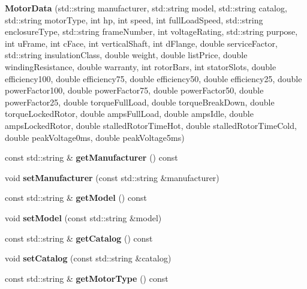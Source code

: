 \begin{DoxyCompactItemize}
{\bfseries Motor\+Data} (std\+::string manufacturer, std\+::string model, std\+::string catalog, std\+::string motor\+Type, int hp, int speed, int full\+Load\+Speed, std\+::string enclosure\+Type, std\+::string frame\+Number, int voltage\+Rating, std\+::string purpose, int u\+Frame, int c\+Face, int vertical\+Shaft, int d\+Flange, double service\+Factor, std\+::string insulation\+Class, double weight, double list\+Price, double winding\+Resistance, double warranty, int rotor\+Bars, int stator\+Slots, double efficiency100, double efficiency75, double efficiency50, double efficiency25, double power\+Factor100, double power\+Factor75, double power\+Factor50, double power\+Factor25, double torque\+Full\+Load, double torque\+Break\+Down, double torque\+Locked\+Rotor, double amps\+Full\+Load, double amps\+Idle, double amps\+Locked\+Rotor, double stalled\+Rotor\+Time\+Hot, double stalled\+Rotor\+Time\+Cold, double peak\+Voltage0ms, double peak\+Voltage5ms)
\item 
\mbox{\label{class_motor_data_a7740ec636c42ee3d6b2a8ce94864043a}} 
const std\+::string \& {\bfseries get\+Manufacturer} () const
\item 
\mbox{\label{class_motor_data_a3bd37613532ae8c3ca1f40d474af75a2}} 
void {\bfseries set\+Manufacturer} (const std\+::string \&manufacturer)
\item 
\mbox{\label{class_motor_data_a464e52cce186661b1491fd48956c2603}} 
const std\+::string \& {\bfseries get\+Model} () const
\item 
\mbox{\label{class_motor_data_a8d5385d24308d0627f7840ecfe2e6513}} 
void {\bfseries set\+Model} (const std\+::string \&model)
\item 
\mbox{\label{class_motor_data_a051ccda5450df2ccae18db8087fe04b3}} 
const std\+::string \& {\bfseries get\+Catalog} () const
\item 
\mbox{\label{class_motor_data_ac7e264252a15a63a2fd35cbb114478e6}} 
void {\bfseries set\+Catalog} (const std\+::string \&catalog)
\item 
\mbox{\label{class_motor_data_a070b07fa26bcbd9b4ca8ccf5770387e4}} 
const std\+::string \& {\bfseries get\+Motor\+Type} () const

\end{DoxyCompactItemize}
